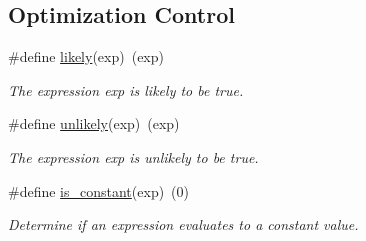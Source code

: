 \subsection*{Optimization Control}
\begin{DoxyCompactItemize}
\item 
\hypertarget{group__group__sam0__utils_gac082df2dd9a1024f6e8d16a61855d989}{}\#define \hyperlink{group__group__sam0__utils_gac082df2dd9a1024f6e8d16a61855d989}{likely}(exp)~(exp)\label{group__group__sam0__utils_gac082df2dd9a1024f6e8d16a61855d989}

\begin{DoxyCompactList}\small\item\em The expression {\itshape exp} is likely to be true. \end{DoxyCompactList}\item 
\hypertarget{group__group__sam0__utils_ga1c0c89beb84d05c5ba0bc7ce527a3925}{}\#define \hyperlink{group__group__sam0__utils_ga1c0c89beb84d05c5ba0bc7ce527a3925}{unlikely}(exp)~(exp)\label{group__group__sam0__utils_ga1c0c89beb84d05c5ba0bc7ce527a3925}

\begin{DoxyCompactList}\small\item\em The expression {\itshape exp} is unlikely to be true. \end{DoxyCompactList}\item 
\#define \hyperlink{group__group__sam0__utils_ga15892ad6884af110e5eaaa96994ebaa9}{is\+\_\+constant}(exp)~(0)
\begin{DoxyCompactList}\small\item\em Determine if an expression evaluates to a constant value. \end{DoxyCompactList}\end{DoxyCompactItemize}
